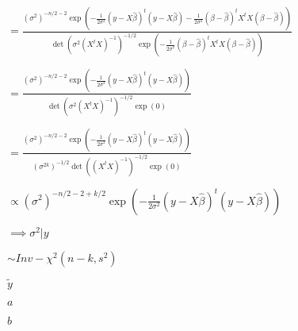 \documentclass[english]{article}
\theoremstyle{plain}
\def\lthtmlcheckvsize{\ifdim\ht\sizebox<\vsize 
  \ifdim\wd\sizebox<\hsize\expandafter\hfill\fi \expandafter\vfill
  \else\expandafter\vss\fi}%
\begin{document}
{\newpage\clearpage
{}%
$\displaystyle =\frac{\left(\sigma^{2}\right)^{-n/2-2}\exp\left(-\frac{1}{2\sigma^{2}}\left(y-X\hat{\beta}\right)^{t}\left(y-X\hat{\beta}\right)-\frac{1}{2\sigma^{2}}\left(\beta-\hat{\beta}\right)^{t}X^{t}X\left(\beta-\hat{\beta}\right)\right)}{\det\left(\sigma^{2}\left(X^{t}X\right)^{-1}\right)^{-1/2}\exp\left(-\frac{1}{2\sigma^{2}}\left(\beta-\hat{\beta}\right)^{t}X^{t}X\left(\beta-\hat{\beta}\right)\right)}$%
\lthtmlindisplaymathZ
\lthtmlcheckvsize\clearpage}

{\newpage\clearpage
{}%
$\displaystyle =\frac{\left(\sigma^{2}\right)^{-n/2-2}\exp\left(-\frac{1}{2\sigma^{2}}\left(y-X\hat{\beta}\right)^{t}\left(y-X\hat{\beta}\right)\right)}{\det\left(\sigma^{2}\left(X^{t}X\right)^{-1}\right)^{-1/2}\exp\left(0\right)}$%
\lthtmlindisplaymathZ
\lthtmlcheckvsize\clearpage}

{\newpage\clearpage
{}%
$\displaystyle =\frac{\left(\sigma^{2}\right)^{-n/2-2}\exp\left(-\frac{1}{2\sigma^{2}}\left(y-X\hat{\beta}\right)^{t}\left(y-X\hat{\beta}\right)\right)}{\left(\sigma^{2k}\right)^{-1/2}\det\left(\left(X^{t}X\right)^{-1}\right)^{-1/2}\exp\left(0\right)}$%
\lthtmlindisplaymathZ
\lthtmlcheckvsize\clearpage}

{\newpage\clearpage
{}%
$\displaystyle \propto\left(\sigma^{2}\right)^{-n/2-2+k/2}\exp\left(-\frac{1}{2\sigma^{2}}\left(y-X\hat{\beta}\right)^{t}\left(y-X\hat{\beta}\right)\right)$%
\lthtmlindisplaymathZ
\lthtmlcheckvsize\clearpage}

{\newpage\clearpage
{}%
$\displaystyle \implies\sigma^{2}|y$%
\lthtmlindisplaymathZ
\lthtmlcheckvsize\clearpage}

{\newpage\clearpage
{}%
$\displaystyle \sim Inv-\chi^{2}\left(n-k,s^{2}\right)$%
\lthtmlindisplaymathZ
\lthtmlcheckvsize\clearpage}

{\newpage\clearpage
{}%
$ \widetilde{y}$%
\lthtmlindisplaymathZ
\lthtmlcheckvsize\clearpage}

{\newpage\clearpage
{}%
$ a$%
\lthtmlindisplaymathZ
\lthtmlcheckvsize\clearpage}

{\newpage\clearpage
{}%
$ b$%
\lthtmlindisplaymathZ
\lthtmlcheckvsize\clearpage}
\end{document}
